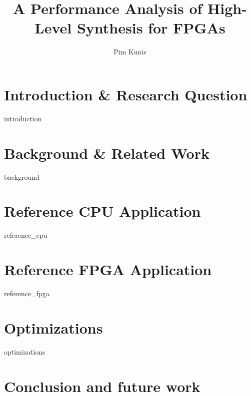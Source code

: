 \documentclass[twoside]{uva-inf-bachelor-thesis}
\title{A Performance Analysis of High-Level Synthesis for FPGAs}
\author{Pim Kunis}
\begin{document}
\maketitle

\begin{abstract}
\end{abstract}

\tableofcontents

\chapter{Introduction \& Research Question} \label{chapter:intro_question}
{introduction}

\chapter{Background \& Related Work} \label{chapter:background_related}
{background}

\chapter{Reference CPU Application} \label{chapter:cpu}
{reference_cpu}

\chapter{Reference FPGA Application} \label{chapter:fpga}
{reference_fpga}

\chapter{Optimizations} \label{chapter:optimizations}
{optimizations}

\chapter{Conclusion and future work} \label{chapter:conclusion}

\printbibliography
\end{document}
